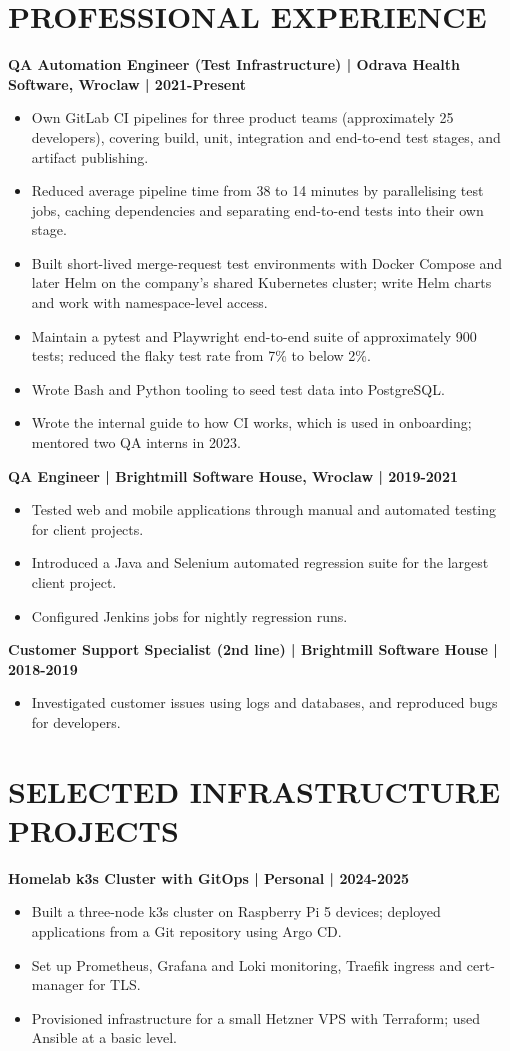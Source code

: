 \documentclass[11pt,a4paper]{article}
\begin{document}
\section*{PROFESSIONAL EXPERIENCE}
\textbf{QA Automation Engineer (Test Infrastructure) | Odrava Health Software, Wroclaw | 2021-Present}
\begin{itemize}
\item Own GitLab CI pipelines for three product teams (approximately 25 developers), covering build, unit, integration and end-to-end test stages, and artifact publishing.
\item Reduced average pipeline time from 38 to 14 minutes by parallelising test jobs, caching dependencies and separating end-to-end tests into their own stage.
\item Built short-lived merge-request test environments with Docker Compose and later Helm on the company's shared Kubernetes cluster; write Helm charts and work with namespace-level access.
\item Maintain a pytest and Playwright end-to-end suite of approximately 900 tests; reduced the flaky test rate from 7\% to below 2\%.
\item Wrote Bash and Python tooling to seed test data into PostgreSQL.
\item Wrote the internal guide to how CI works, which is used in onboarding; mentored two QA interns in 2023.
\end{itemize}

\textbf{QA Engineer | Brightmill Software House, Wroclaw | 2019-2021}
\begin{itemize}
\item Tested web and mobile applications through manual and automated testing for client projects.
\item Introduced a Java and Selenium automated regression suite for the largest client project.
\item Configured Jenkins jobs for nightly regression runs.
\end{itemize}

\textbf{Customer Support Specialist (2nd line) | Brightmill Software House | 2018-2019}
\begin{itemize}
\item Investigated customer issues using logs and databases, and reproduced bugs for developers.
\end{itemize}

\section*{SELECTED INFRASTRUCTURE PROJECTS}
\textbf{Homelab k3s Cluster with GitOps | Personal | 2024-2025}
\begin{itemize}
\item Built a three-node k3s cluster on Raspberry Pi 5 devices; deployed applications from a Git repository using Argo CD.
\item Set up Prometheus, Grafana and Loki monitoring, Traefik ingress and cert-manager for TLS.
\item Provisioned infrastructure for a small Hetzner VPS with Terraform; used Ansible at a basic level.
\end{itemize}
\end{document}
